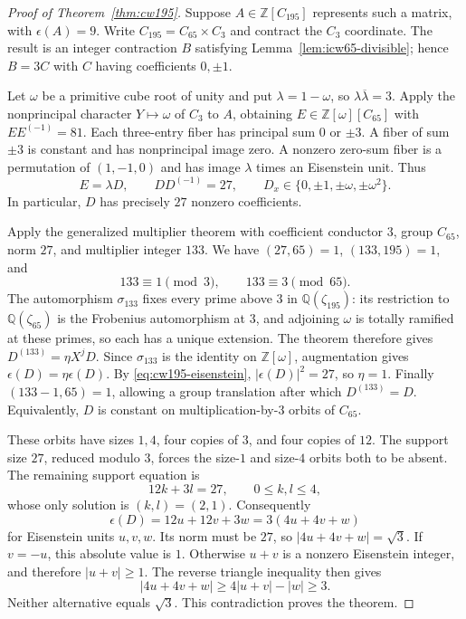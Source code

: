 \documentclass[11pt]{article}
\theoremstyle{remark}
\numberwithin{equation}{section}
\begin{document}
\begin{proof}[Proof of Theorem~\ref{thm:cw195}]
Suppose $A\in\mathbb Z[C_{195}]$ represents such a matrix, with
$\epsilon(A)=9$. Write $C_{195}=C_{65}\times C_3$ and contract the
$C_3$ coordinate. The result is an integer contraction $B$ satisfying
Lemma~\ref{lem:icw65-divisible}; hence $B=3C$ with $C$ having coefficients
$0,\pm1$.

Let $\omega$ be a primitive cube root of unity and put $\lambda=1-\omega$,
so $\lambda\overline\lambda=3$. Apply the nonprincipal character
$Y\mapsto\omega$ of $C_3$ to $A$, obtaining
$E\in\mathbb Z[\omega][C_{65}]$ with $EE^{(-1)}=81$.
Each three-entry fiber has principal sum $0$ or $\pm3$.
A fiber of sum $\pm3$ is constant and has nonprincipal image zero.
A nonzero zero-sum fiber is a permutation of $(1,-1,0)$ and has image
$\lambda$ times an Eisenstein unit. Thus
\begin{equation}\label{eq:cw195-eisenstein}
 E=\lambda D,\qquad DD^{(-1)}=27,
 \qquad D_x\in\{0,\pm1,\pm\omega,\pm\omega^2\}.
\end{equation}
In particular, $D$ has precisely $27$ nonzero coefficients.

Apply the generalized multiplier theorem with coefficient conductor $3$,
group $C_{65}$, norm $27$, and multiplier integer $133$.
We have $(27,65)=1$, $(133,195)=1$, and
\[
 133\equiv1\pmod3,\qquad133\equiv3\pmod{65}.
\]
The automorphism $\sigma_{133}$ fixes every prime above $3$ in
$\mathbb Q(\zeta_{195})$: its restriction to $\mathbb Q(\zeta_{65})$
is the Frobenius automorphism at $3$, and adjoining $\omega$ is totally
ramified at these primes, so each has a unique extension.
The theorem therefore gives $D^{(133)}=\eta X^jD$.
Since $\sigma_{133}$ is the identity on $\mathbb Z[\omega]$, augmentation
gives $\epsilon(D)=\eta\epsilon(D)$. By
\eqref{eq:cw195-eisenstein}, $|\epsilon(D)|^2=27$, so $\eta=1$.
Finally $(133-1,65)=1$, allowing a group translation after which
$D^{(133)}=D$. Equivalently, $D$ is constant on multiplication-by-$3$
orbits of $C_{65}$.

These orbits have sizes $1,4$, four copies of $3$, and four copies of $12$.
The support size $27$, reduced modulo $3$, forces the size-$1$ and size-$4$
orbits both to be absent. The remaining support equation is
\[
 12k+3l=27,\qquad0\le k,l\le4,
\]
whose only solution is $(k,l)=(2,1)$. Consequently
\[
 \epsilon(D)=12u+12v+3w=3(4u+4v+w)
\]
for Eisenstein units $u,v,w$. Its norm must be $27$, so
$|4u+4v+w|=\sqrt3$. If $v=-u$, this absolute value is $1$.
Otherwise $u+v$ is a nonzero Eisenstein integer, and therefore
$|u+v|\ge1$. The reverse triangle inequality then gives
\[
 |4u+4v+w|\ge4|u+v|-|w|\ge3.
\]
Neither alternative equals $\sqrt3$. This contradiction proves the theorem.
\end{proof}
\end{document}
